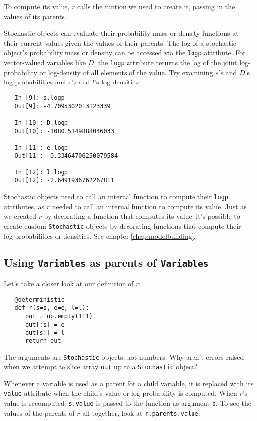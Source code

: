 To compute its value, $r$ calls the funtion we used to create it, passing in the values of its parents.

Stochastic objects can evaluate their probability mass or density functions at their current values given the values of their parents. The log of a stochastic object's probability mass or density can be accessed via the \texttt{logp} attribute. For vector-valued variables like $D$, the \texttt{logp} attribute returns the log of the joint log-probability or log-density of all elements of the value. Try examining $s$'s and $D$'s log-probabilities and $e$'s and $l$'s log-densities:
\begin{verbatim}
   In [9]: s.logp
   Out[9]: -4.7095302013123339

   In [10]: D.logp
   Out[10]: -1080.5149888046033

   In [11]: e.logp
   Out[11]: -0.33464706250079584

   In [12]: l.logp
   Out[12]: -2.6491936762267811
\end{verbatim}
Stochastic objects need to call an internal function to compute their \texttt{logp} attributes, as $r$ needed to call an internal function to compute its value. Just as we created $r$ by decorating a function that computes its value, it's possible to create custom \texttt{Stochastic} objects by decorating functions that compute their log-probabilities or densities. See chapter \ref{chap:modelbuilding}. 

\subsection*{Using \texttt{Variables} as parents of \texttt{Variables}}

Let's take a closer look at our definition of $r$:
\begin{verbatim}
   @deterministic
   def r(s=s, e=e, l=l):
      out = np.empty(111)
      out[:s] = e
      out[s:] = l
      return out
\end{verbatim}
The arguments are \texttt{Stochastic} objects, not numbers. Why aren't errors raised when we attempt to slice array \texttt{out} up to a \texttt{Stochastic} object?

Whenever a variable is used as a parent for a child variable, it is replaced with its \texttt{value} attribute when the child's value or log-probability is computed. When $r$'s value is recomputed, \texttt{s.value} is passed to the function as argument \texttt{s}. To see the values of the parents of $r$ all together, look at \texttt{r.parents.value}.

